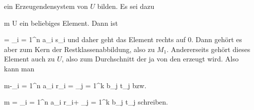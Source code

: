 { {  }

ein Erzeugendensystem von $U$ bilden. Es sei dazu

\mavergleichskette
{\vergleichskette
{ m
}
{ \in }{ U
}
{  }{
}
{    }{
}
{   }{
}
}
{}{}{}
ein beliebiges Element. Dann ist

\mavergleichskette
{\vergleichskette
{ 
}
{ = }{ \sum_{i = 1}^n  a_i s_i
}
{  }{
}
{    }{
}
{   }{
}
}
{}{}{}
und daher geht das Element
 rechts auf $0$. Dann gehört es aber zum Kern der Restklassenabbildung, also zu $M_1$. Andererseits gehört dieses Element auch zu $U$, also zum Durchschnitt
 der ja von den
 erzeugt wird. Also kann man

\mavergleichskettedisp
{\vergleichskette
{ m-\sum_{i = 1}^n  a_i r_i
}
{ =} { \sum_{j = 1}^k  b_j t_j
}
{ } {
}
{ } {
}
{ } {
}
}
{}{}{}
bzw.

\mavergleichskette
{\vergleichskette
{m
}
{ = }{ \sum_{i = 1}^n  a_i r_i+ \sum_{j = 1}^k  b_j t_j
}
{  }{
}
{    }{
}
{   }{
}
}
{}{}{}
schreiben.




}






